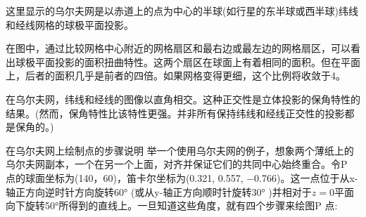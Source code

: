 这里显示的乌尔夫网是以赤道上的点为中心的半球(如行星的东半球或西半球)纬线和经线网格的球极平面投影。

在图中，通过比较网格中心附近的网格扇区和最右边或最左边的网格扇区，可以看出球极平面投影的面积扭曲特性。这两个扇区在球面上有着相同的面积。但在平面上，后者的面积几乎是前者的四倍。如果网格变得更细，这个比例将收敛于4。

在乌尔夫网，纬线和经线的图像以直角相交。这种正交性是立体投影的保角特性的结果。(然而，保角特性比该特性更强。并非所有保持纬线和经线正交性的投影都是保角的。)

在乌尔夫网上绘制点的步骤说明
举一个使用乌尔夫网的例子，想象两个薄纸上的乌尔夫网副本，一个在另一个上面，对齐并保证它们的共同中心始终重合。令P 点的球面坐标为(140，60)，笛卡尔坐标为(0.321, 0.557, −0.766)。这一点位于从x-轴正方向逆时针方向旋转60° (或从y-轴正方向顺时针旋转30° )并相对于$z = 0$平面向下旋转50°所得到的直线上。一旦知道这些角度，就有四个步骤来绘图P 点:
